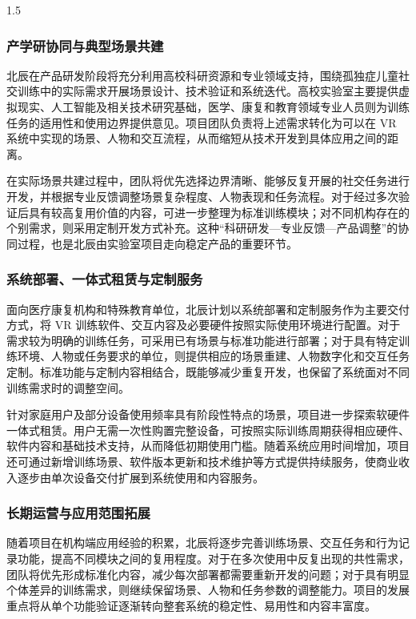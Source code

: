 \documentclass[zihao=-4]{ctexart}
\begin{document}
\begin{spacing}{1.5}
\subsubsection{产学研协同与典型场景共建}

北辰在产品研发阶段将充分利用高校科研资源和专业领域支持，围绕孤独症儿童社交训练中的实际需求开展场景设计、技术验证和系统迭代。高校实验室主要提供虚拟现实、人工智能及相关技术研究基础，医学、康复和教育领域专业人员则为训练任务的适用性和使用边界提供意见。项目团队负责将上述需求转化为可以在 VR 系统中实现的场景、人物和交互流程，从而缩短从技术开发到具体应用之间的距离。

在实际场景共建过程中，团队将优先选择边界清晰、能够反复开展的社交任务进行开发，并根据专业反馈调整场景复杂程度、人物表现和任务流程。对于经过多次验证后具有较高复用价值的内容，可进一步整理为标准训练模块；对不同机构存在的个别需求，则采用定制开发方式补充。这种“科研研发—专业反馈—产品调整”的协同过程，也是北辰由实验室项目走向稳定产品的重要环节。

\subsubsection{系统部署、一体式租赁与定制服务}

面向医疗康复机构和特殊教育单位，北辰计划以系统部署和定制服务作为主要交付方式，将 VR 训练软件、交互内容及必要硬件按照实际使用环境进行配置。对于需求较为明确的训练任务，可采用已有场景与标准功能进行部署；对于具有特定训练环境、人物或任务要求的单位，则提供相应的场景重建、人物数字化和交互任务定制。标准功能与定制内容相结合，既能够减少重复开发，也保留了系统面对不同训练需求时的调整空间。

针对家庭用户及部分设备使用频率具有阶段性特点的场景，项目进一步探索软硬件一体式租赁。用户无需一次性购置完整设备，可按照实际训练周期获得相应硬件、软件内容和基础技术支持，从而降低初期使用门槛。随着系统应用时间增加，项目还可通过新增训练场景、软件版本更新和技术维护等方式提供持续服务，使商业收入逐步由单次设备交付扩展到系统使用和内容服务。

\subsubsection{长期运营与应用范围拓展}

随着项目在机构端应用经验的积累，北辰将逐步完善训练场景、交互任务和行为记录功能，提高不同模块之间的复用程度。对于在多次使用中反复出现的共性需求，团队将优先形成标准化内容，减少每次部署都需要重新开发的问题；对于具有明显个体差异的训练需求，则继续保留场景、人物和任务参数的调整能力。项目的发展重点将从单个功能验证逐渐转向整套系统的稳定性、易用性和内容丰富度。


\end{spacing}
\end{document}
